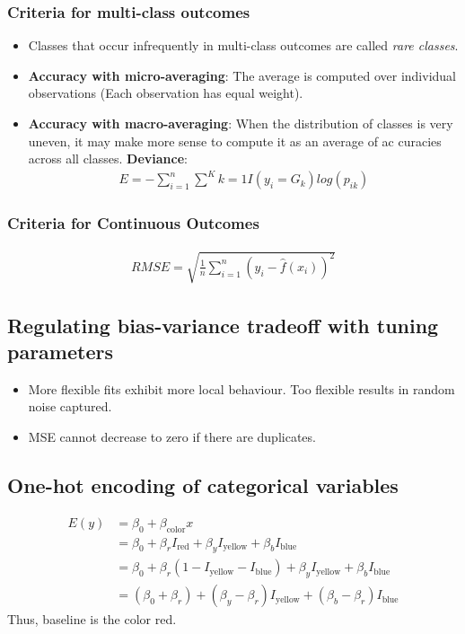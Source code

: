 \documentclass[12pt, oneside]{article}
\begin{document}
\subsubsection{Criteria for multi-class outcomes}
\begin{itemize}
    \item Classes that occur infrequently in multi-class outcomes are called \emph{rare classes}.
    \item \textbf{Accuracy with micro-averaging}: The average is computed over individual observations (Each observation has equal weight). 
    \item \textbf{Accuracy with macro-averaging}: When the distribution of classes is very uneven, it may make more sense to compute it as an average of ac curacies across all classes. 
    \textbf{Deviance}:
    \begin{align*}
        E = - \sum^n_{i=1}\sum^K{k=1} I(y_i = G_k)log(p_{ik})
    \end{align*}
\end{itemize}

\subsubsection{Criteria for Continuous Outcomes}
\begin{align*}
    RMSE  = \sqrt{\frac{1}{n}\sum^n_{i=1}(y_i - \widehat{f}(x_i))^2}
\end{align*}

\subsection{Regulating bias-variance tradeoff with tuning parameters}
\begin{itemize}
    \item More flexible fits exhibit more local behaviour. Too flexible results in random noise captured. 
    \item MSE cannot decrease to zero if there are duplicates. 
\end{itemize}

\subsection{One-hot encoding of categorical variables}
\begin{align*}
    E(y) &= \beta_0 + \beta_{\text{color}}x\\
    &=  \beta_0 + \beta_rI_{\text{red}} + \beta_yI_{\text{yellow}} + \beta_bI_{\text{blue}} \\
    &= \beta_0 + \beta_r({1 - I_\text{yellow} - I_\text{blue}}) + \beta_yI_{\text{yellow}} + \beta_bI_{\text{blue}}\\
    &= (\beta_0 + \beta_r) + (\beta_y-\beta_r)I_{\text{yellow}} + (\beta_b-\beta_r)I_{\text{blue}}
\end{align*}
Thus, baseline is the color red.
\end{document}
